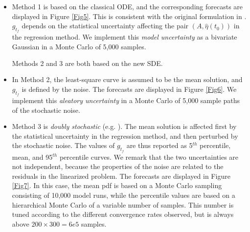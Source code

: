 \documentclass{article}
\begin{document}
\begin{itemize}
\item Method 1 is based on the classical ODE, and the corresponding forecasts are displayed in Figure \ref{Fig5}. This is consistent with the original formulation in \cite{Voight1988}. $g_{t_f}$ depends on the statistical uncertainty affecting the pair $(A, \hat\eta(t_0))$ in the regression method. We implement this \emph{model uncertainty} as a bivariate Gaussian in a Monte Carlo of 5,000 samples.

Methods 2 and 3 are both based on the new SDE. 
\item In Method 2, the least-square curve is assumed to be the mean solution, and $g_{t_f}$ is defined by the noise. The forecasts are displayed in Figure \ref{Fig6}. We implement this \emph{aleatory uncertainty} in a Monte Carlo of 5,000 sample paths of the stochastic noise.

\item Method 3 is \emph{doubly stochastic} (e.g. \cite{Bevilacqua2016}). The mean solution is affected first by the statistical uncertainty in the regression method, and then perturbed by the stochastic noise. The values of $g_{t_f}$ are thus reported as 5$^{th}$ percentile, mean, and 95$^{th}$ percentile curves. We remark that the two uncertainties are not independent, because the properties of the noise are related to the residuals in the linearized problem. The forecasts are displayed in Figure \ref{Fig7}. In this case, the mean pdf is based on a Monte Carlo sampling consisting of 10,000 model runs, while the percentile values are based on a hierarchical Monte Carlo of a variable number of samples. This number is tuned according to the different convergence rates observed, but is always above $200\times300=6e5$ samples.
\end{itemize}
\end{document}
